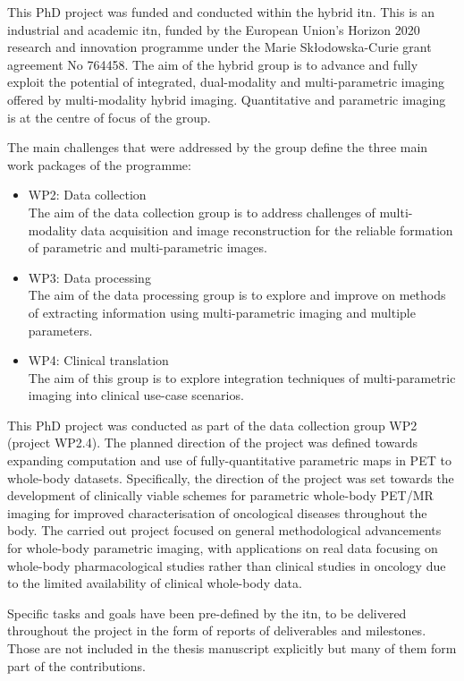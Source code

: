 This PhD project was funded and conducted within the \Gls{hybrid} \gls{itn}. This is an industrial and academic \gls{itn}, funded by the European Union's Horizon 2020 research and innovation programme under the Marie Sk\l{}odowska-Curie grant agreement No 764458.
The aim of the \gls{hybrid} group is to advance and fully exploit the potential of integrated, dual-modality and multi-parametric imaging offered by multi-modality hybrid imaging. Quantitative and parametric imaging is at the centre of focus of the group. 

The main challenges that were addressed by the group define the three main work packages of the programme:
\begin{itemize}
    \item WP2: Data collection \\
    The aim of the data collection group is to address challenges of multi-modality data acquisition and image reconstruction for the reliable formation of parametric and multi-parametric images.
    \item WP3: Data processing \\
    The aim of the data processing group is to explore and improve on methods of extracting information using multi-parametric imaging and multiple parameters. 
    \item WP4: Clinical translation \\
    The aim of this group is to explore integration techniques of multi-parametric imaging into clinical use-case scenarios. 
\end{itemize}

This PhD project was conducted as part of the data collection group WP2 (project WP2.4). The planned direction of the project was defined towards expanding computation and use of fully-quantitative parametric maps in PET to whole-body datasets. Specifically, the direction of the project was set towards the development of clinically viable schemes for parametric whole-body PET/MR imaging for improved characterisation of oncological diseases throughout the body. The carried out project focused on general methodological advancements for whole-body parametric imaging, with applications on real data focusing on whole-body pharmacological studies rather than clinical studies in oncology due to the limited availability of clinical whole-body data.

Specific tasks and goals have been pre-defined by the \gls{itn}, to be delivered throughout the project in the form of reports of deliverables and milestones. Those are not included in the thesis manuscript explicitly but many of them form part of the contributions. 

